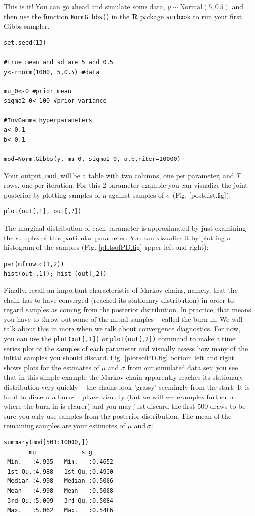 This is it! You can go ahead and simulate some data, $y \sim \mbox{Normal}(5, 0.5)$ and then use the function \mbox{\tt NormGibbs()} in the {\bf
  R} package \mbox{\tt scrbook} to run your first Gibbs sampler. 

\begin{verbatim}
set.seed(13)

#true mean and sd are 5 and 0.5
y<-rnorm(1000, 5,0.5) #data

mu_0<-0 #prior mean
sigma2_0<-100 #prior variance 

#InvGamma hyperparameters
a<-0.1
b<-0.1 

mod=Norm.Gibbs(y, mu_0, sigma2_0, a,b,niter=10000)
\end{verbatim}

Your output, \verb#mod#, will be a table with two columns, one per
parameter, and $T$ rows, one per iteration. For this 2-parameter example
you can visualize the joint posterior by plotting samples of $\mu$
against samples of $\sigma$ (Fig. \ref{postdist.fig}):
\begin{verbatim}
plot(out[,1], out[,2])
\end{verbatim}
The marginal distribution of each parameter is approximated by just
examining the samples of this particular parameter. You can visualize
it by plotting a histogram of the samples (Fig. \ref{plotsofPD.fig} upper left and right):
\begin{verbatim}
par(mfrow=c(1,2))
hist(out[,1]); hist (out[,2])
\end{verbatim}

Finally, recall an important characteristic of Markov chains, namely,
that the chain has to have converged (reached its stationary
distribution) in order to regard samples as coming from the posterior distribution. In
practice, that means you have to throw out some of the initial samples
– called the burn-in. We will talk about this in more when we talk
about convergence diagnostics. For now, you can use the
\verb#plot(out[,1])# or \verb#plot(out[,2])# command to make a time
series plot of the samples of each parameter and visually assess how
many of the initial samples you should discard. Fig. \ref{plotsofPD.fig} bottom left and right shows
plots for the estimates of $\mu$ and $\sigma$ from our simulated data set;
you see that in this simple example the Markov chain apparently
reaches its stationary distribution very quickly -- the chains look
'grassy' seemingly from the start. It is hard to discern a burn-in
phase visually (but we will see examples further on where the burn-in
is clearer) and you may just discard the first 500 draws to be sure
you only use samples from the posterior distribution. The mean of the
remaining samples are your estimates of $\mu$ and $\sigma$:
\begin{verbatim}
summary(mod[501:10000,])
       mu             sig        
 Min.   :4.935   Min.   :0.4652  
 1st Qu.:4.988   1st Qu.:0.4930  
 Median :4.998   Median :0.5006  
 Mean   :4.998   Mean   :0.5008  
 3rd Qu.:5.009   3rd Qu.:0.5084  
 Max.   :5.062   Max.   :0.5486  
\end{verbatim}


